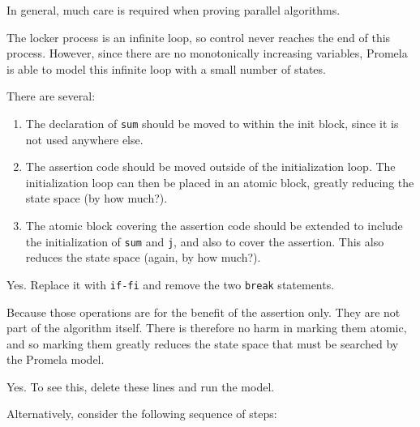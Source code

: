 	In general, much care is required when proving parallel algorithms.


The locker process is an infinite loop, so control
never reaches the end of this process.
However, since there are no monotonically increasing variables,
Promela is able to model this infinite loop with a small
number of states.


There are several:
\begin{enumerate}
\item	The declaration of {\tt sum} should be moved to within
	the init block, since it is not used anywhere else.
\item	The assertion code should be moved outside of the
	initialization loop.  The initialization loop can
	then be placed in an atomic block, greatly reducing
	the state space (by how much?).
\item	The atomic block covering the assertion code should
	be extended to include the initialization of {\tt sum}
	and {\tt j}, and also to cover the assertion.
	This also reduces the state space (again, by how
	much?).
\end{enumerate}


Yes.  Replace it with {\tt if-fi} and remove the two {\tt break} statements.


Because those operations are for the benefit of the
assertion only.  They are not part of the algorithm itself.
There is therefore no harm in marking them atomic, and
so marking them greatly reduces the state space that must
be searched by the Promela model.


Yes.  To see this, delete these lines and run the model.

Alternatively, consider the following sequence of steps:

